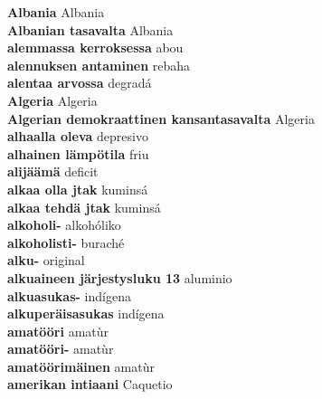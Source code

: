 \textbf{ Albania  } Albania \\
\textbf{ Albanian tasavalta  } Albania \\
\textbf{ alemmassa kerroksessa  } abou \\
\textbf{ alennuksen antaminen  } rebaha \\
\textbf{ alentaa arvossa  } degradá \\
\textbf{ Algeria  } Algeria \\
\textbf{ Algerian demokraattinen kansantasavalta  } Algeria \\
\textbf{ alhaalla oleva  } depresivo \\
\textbf{ alhainen lämpötila  } friu \\
\textbf{ alijäämä  } deficit \\
\textbf{ alkaa olla jtak  } kuminsá \\
\textbf{ alkaa tehdä jtak  } kuminsá \\
\textbf{ alkoholi-  } alkohóliko \\
\textbf{ alkoholisti-  } buraché \\
\textbf{ alku-  } original \\
\textbf{ alkuaineen järjestysluku 13  } aluminio \\
\textbf{ alkuasukas-  } indígena \\
\textbf{ alkuperäisasukas  } indígena \\
\textbf{ amatööri  } amatùr \\
\textbf{ amatööri-  } amatùr \\
\textbf{ amatöörimäinen  } amatùr \\
\textbf{ amerikan intiaani  } Caquetio \\
